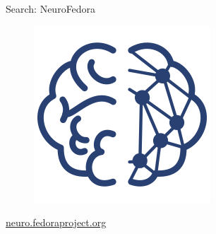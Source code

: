\begin{frame}[c]{Search: NeuroFedora}
  \begin{figure}[h]
    \centering
    \includegraphics[keepaspectratio,height=0.5\textheight]{99_images/NeuroFedoraLogo01.png}
  \end{figure}
  \begin{center}
    \url{neuro.fedoraproject.org}
  \end{center}
\end{frame}

